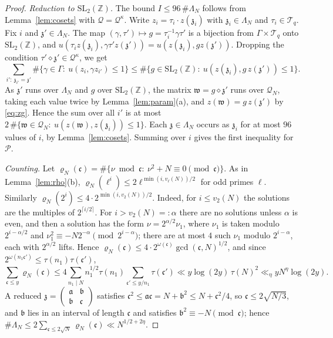 \documentclass[11pt]{amsart}
\theoremstyle{remark}
\theoremstyle{definition}
\numberwithin{equation}{section}
\newcommand{\Qc}{\mathcal{Q}}
\newcommand{\Tc}{\mathcal{T}}
\newcommand{\Pc}{\mathcal{P}}
\newcommand{\Z}{\mathbb{Z}}
\newcommand{\ga}{\mathfrak{a}}
\newcommand{\gb}{\mathfrak{b}}
\newcommand{\gc}{\mathfrak{c}}
\newcommand{\gz}{\mathfrak{z}}
\newcommand{\gw}{\mathfrak{w}}
\newcommand{\SL}{\mathrm{SL}}
\begin{document}
\begin{proof}
\emph{Reduction to $\SL_2(\Z)$.} The bound $I\le96\,\#\Lambda_N$ follows from Lemma~\ref{lem:cosets} with $\Qc=\Qc^\kappa$. Write $z_i=\tau_i\cdot z(\gz_i)$ with $\gz_i\in\Lambda_N$ and $\tau_i\in\Tc_q$. Fix $i$ and $\gz'\in\Lambda_N$. The map $(\gamma,\tau')\mapsto g=\tau_i^{-1}\gamma\tau'$ is a bijection from $\Gamma\times\Tc_q$ onto $\SL_2(\Z)$, and $u(\tau_iz(\gz_i),\gamma\tau'z(\gz'))=u(z(\gz_i),gz(\gz'))$. Dropping the condition $\tau'\diamond\gz'\in\Qc^\kappa$, we get
\[
\sum_{i':\ \gz_{i'}=\gz'}\#\{\gamma\in\Gamma:\ u(z_i,\gamma z_{i'})\le1\}\le\#\{g\in\SL_2(\Z):\ u(z(\gz_i),g\,z(\gz'))\le1\}.
\]
As $\gz'$ runs over $\Lambda_N$ and $g$ over $\SL_2(\Z)$, the matrix $\gw=g\diamond\gz'$ runs over $\Qc_N$, taking each value twice by Lemma~\ref{lem:param}(a), and $z(\gw)=g\,z(\gz')$ by \eqref{eq:zg}. Hence the sum over all $i'$ is at most $2\,\#\{\gw\in\Qc_N:\ u(z(\gw),z(\gz_i))\le1\}$. Each $\gz\in\Lambda_N$ occurs as $\gz_i$ for at most $96$ values of $i$, by Lemma~\ref{lem:cosets}. Summing over $i$ gives the first inequality for $\Pc$.

\emph{Counting.} Let $\varrho_N(\gc)=\#\{\nu\bmod\gc:\ \nu^2+N\equiv0\pmod\gc\}$. As in Lemma~\ref{lem:rho}(b), $\varrho_N(\ell^i)\le2\ell^{\min(i,v_\ell(N))/2}$ for odd primes $\ell$. Similarly $\varrho_N(2^i)\le4\cdot2^{\min(i,v_2(N))/2}$. Indeed, for $i\le v_2(N)$ the solutions are the multiples of $2^{\lceil i/2\rceil}$. For $i>v_2(N)=:\alpha$ there are no solutions unless $\alpha$ is even, and then a solution has the form $\nu=2^{\alpha/2}\nu_1$, where $\nu_1$ is taken modulo $2^{i-\alpha/2}$ and $\nu_1^2\equiv-N2^{-\alpha}\pmod{2^{i-\alpha}}$; there are at most $4$ such $\nu_1$ modulo $2^{i-\alpha}$, each with $2^{\alpha/2}$ lifts. Hence $\varrho_N(\gc)\le4\cdot2^{\omega(\gc)}\gcd(\gc,N)^{1/2}$, and since $2^{\omega(n_1\gc')}\le\tau(n_1)\tau(\gc')$,
\[
\sum_{\gc\le y}\varrho_N(\gc)\le4\sum_{n_1\mid N}n_1^{1/2}\tau(n_1)\sum_{\gc'\le y/n_1}\tau(\gc')\ll y\log(2y)\,\tau(N)^2\ll_\eta yN^{\eta}\log(2y).
\]
A reduced $\gz=\left(\begin{smallmatrix}\ga&\gb\\ \gb&\gc\end{smallmatrix}\right)$ satisfies $\gc^2\le\ga\gc=N+\gb^2\le N+\gc^2/4$, so $\gc\le2\sqrt{N/3}$, and $\gb$ lies in an interval of length $\gc$ and satisfies $\gb^2\equiv-N\pmod\gc$; hence $\#\Lambda_N\le2\sum_{\gc\le2\sqrt N}\varrho_N(\gc)\ll N^{1/2+2\eta}$.


\end{proof}
\end{document}
